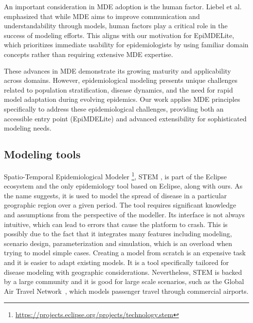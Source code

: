 An important consideration in MDE adoption is the human factor. Liebel et al.~\cite{liebel2024humanfactors} emphasized that while MDE aims to improve communication and understandability through models, human factors play a critical role in the success of modeling efforts. This aligns with our motivation for EpiMDELite, which prioritizes immediate usability for epidemiologists by using familiar domain concepts rather than requiring extensive MDE expertise.

These advances in MDE demonstrate its growing maturity and applicability across domains. However, epidemiological modeling presents unique challenges related to population stratification, disease dynamics, and the need for rapid model adaptation during evolving epidemics. Our work applies MDE principles specifically to address these epidemiological challenges, providing both an accessible entry point (EpiMDELite) and advanced extensibility for sophisticated modeling needs.

\subsection{Modeling tools}

Spatio-Temporal Epidemiological Modeler \footnote{\url{https://projects.eclipse.org/projects/technology.stem}}, STEM \cite{STEM}, is part of the Eclipse ecosystem and the only epidemiology tool based on Eclipse, along with ours. As the name suggests, it is used to model the spread of disease in a particular geographic region over a given period. The tool requires significant knowledge and assumptions from the perspective of the modeller. Its interface is not always intuitive, which can lead to errors that cause the platform to crash. This is possibly due to the fact that it integrates many features including modeling, scenario design, parameterization and simulation, which is an overload when trying to model simple cases. Creating a model from scratch is an expensive task and it is easier to adapt existing models. It is a tool specifically tailored for disease modeling with geographic considerations. Nevertheless, STEM is backed by a large community and it is good for large scale scenarios, such as the Global Air Travel Network~\cite{STEM}, which models passenger travel through commercial airports.

